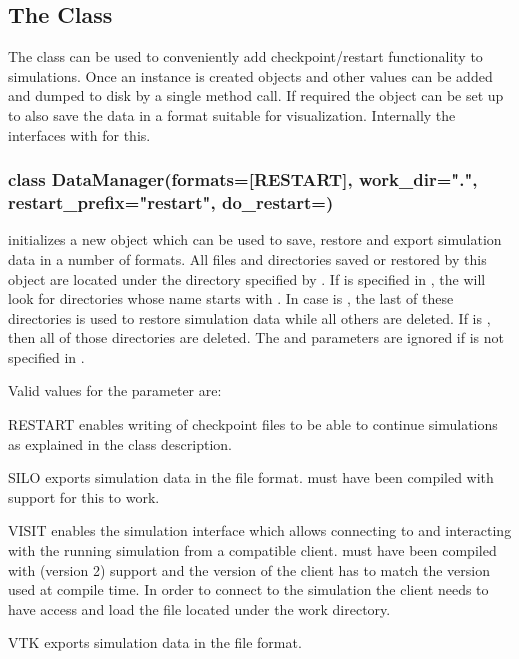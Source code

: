 \subsection{The  Class}
\label{sec:datamanager}

The  class can be used to conveniently add checkpoint/restart
functionality to \escript simulations.
Once an instance is created \Data objects and other values can be added and
dumped to disk by a single method call.
If required the object can be set up to also save the data in a format suitable
for visualization.
Internally the  interfaces with \weipa for this.

\subsubsection*{class DataManager(formats=[RESTART], work_dir=".", restart_prefix="restart", do_restart=\True)}
initializes a new  object which can be used to save,
    restore and export simulation data in a number of formats.
    All files and directories saved or restored by this object are located
    under the directory specified by .
    If  is specified in , the  will
    look for directories whose name starts with .
    In case  is \True, the last of these directories is used
    to restore simulation data while all others are deleted.
    If  is \False, then all of those directories are deleted.
    The  and  parameters are ignored if
     is not specified in .


\noindent Valid values for the  parameter are:
\begin{memberdesc}[DataManager]{RESTART}
    enables writing of checkpoint files to be able to continue simulations
    as explained in the class description.
\end{memberdesc}
\begin{memberdesc}[DataManager]{SILO}
    exports simulation data in the \SILO file format. \escript must have
    been compiled with \SILO support for this to work.
\end{memberdesc}
\begin{memberdesc}[DataManager]{VISIT}
    enables the \VisIt simulation interface which allows connecting to and
    interacting with the running simulation from a compatible \VisIt client.
    \escript must have been compiled with \VisIt (version 2) support and the
    version of the client has to match the version used at compile time.
    In order to connect to the simulation the client needs to have access and
    load the file  located under the work directory.
\end{memberdesc}
\begin{memberdesc}[DataManager]{VTK}
    exports simulation data in the \VTK file format.
\end{memberdesc}

